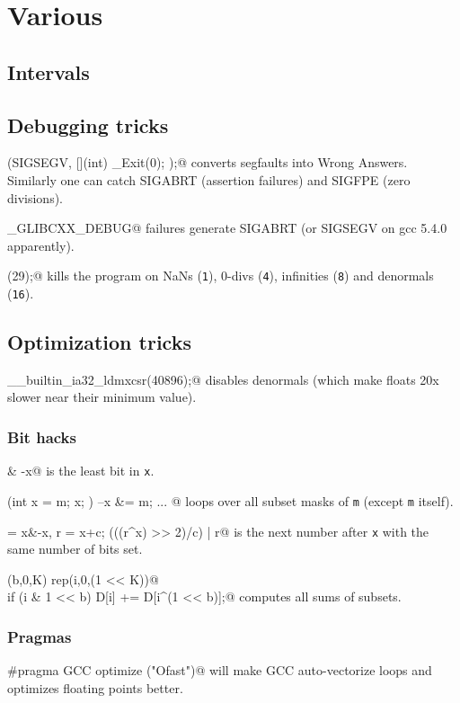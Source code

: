 \chapter{Various}

\section{Intervals}


\section{Debugging tricks}
\verb@signal(SIGSEGV, [](int) { _Exit(0); });@ converts segfaults into Wrong Answers.
			Similarly one can catch SIGABRT (assertion failures) and SIGFPE (zero divisions).

\verb@_GLIBCXX_DEBUG@ failures generate SIGABRT (or SIGSEGV on gcc 5.4.0 apparently).

\verb@feenableexcept(29);@ kills the program on NaNs (\texttt 1), 0-divs (\texttt 4), infinities (\texttt 8) and denormals (\texttt{16}).

\section{Optimization tricks}
	\verb@__builtin_ia32_ldmxcsr(40896);@ disables denormals (which make floats 20x slower near their minimum value).
	\subsection{Bit hacks}
		\verb@x & -x@ is the least bit in \texttt{x}.
		
		\verb@for (int x = m; x; ) { --x &= m; ... }@ loops over all subset masks of \texttt{m} (except \texttt{m} itself).
		
		\verb@c = x&-x, r = x+c; (((r^x) >> 2)/c) | r@ is the next number after \texttt{x} with the same number of bits set.
		
		\verb@rep(b,0,K) rep(i,0,(1 << K))@ \\ \verb@  if (i & 1 << b) D[i] += D[i^(1 << b)];@ computes all sums of subsets.
	\subsection{Pragmas}
		\verb@#pragma GCC optimize ("Ofast")@ will make GCC auto-vectorize loops and optimizes floating points better.
		
